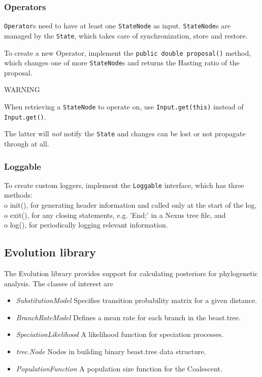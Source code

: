 \documentclass{article}
\begin{document}
\subsubsection{Operators\label{ssec.oper}}

{\tt Operator}s need to have at least one {\tt StateNode} as input.
{\tt StateNode}s are managed by the {\tt State}, which takes care of synchronization,
store and restore.

To create a new Operator, implement the {\tt public double proposal()} method, 
which changes one of more {\tt StateNode}s and returns the Hasting ratio of the proposal.

\begin{center}{\huge WARNING}\end{center}

When retrieving a {\tt StateNode} to operate on, use {\tt Input.get(this)} instead of
{\tt Input.get()}. 

The latter will {\em not} notify the {\tt State} and changes can be lost or not
propagate through at all.

\subsubsection{Loggable\label{ssec.logger}}

To create custom loggers, implement the {\tt Loggable} interface, which has three methods:\\
o init(), for generating header information and called only at the start of the log,\\
o exit(), for any closing statements, e.g. 'End;' in a Nexus tree file, and\\
o log(), for periodically logging relevant information.



\subsection{Evolution library\label{ssec.evo}}

The Evolution library provides support for calculating posteriors for
phylogenetic analysis. The classes of interest are
\begin{itemize}
\item{\em SubstitutionModel} Specifies transition probability matrix for a given distance.
\item{\em BranchRateModel} Defines a mean rate for each branch in the beast.tree.
\item{\em SpeciationLikelihood} A likelihood function for speciation processes.
\item{\em tree.Node} Nodes in building binary beast.tree data structure.
\item{\em PopulationFunction} A population size function for the Coalescent.
\end{itemize}
\end{document}
